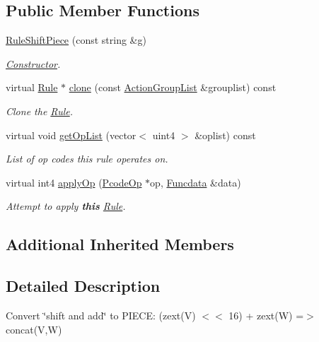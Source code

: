 \subsection*{Public Member Functions}
\begin{DoxyCompactItemize}
\item 
\mbox{\hyperlink{class_rule_shift_piece_ae172d9256665172380a01364810b1efa}{Rule\+Shift\+Piece}} (const string \&g)
\begin{DoxyCompactList}\small\item\em \mbox{\hyperlink{class_constructor}{Constructor}}. \end{DoxyCompactList}\item 
virtual \mbox{\hyperlink{class_rule}{Rule}} $\ast$ \mbox{\hyperlink{class_rule_shift_piece_a891c9165fecfdfb57858dca7701889a0}{clone}} (const \mbox{\hyperlink{class_action_group_list}{Action\+Group\+List}} \&grouplist) const
\begin{DoxyCompactList}\small\item\em Clone the \mbox{\hyperlink{class_rule}{Rule}}. \end{DoxyCompactList}\item 
virtual void \mbox{\hyperlink{class_rule_shift_piece_afbb6dc1f0c7e486d8eeaf9ee867a2871}{get\+Op\+List}} (vector$<$ uint4 $>$ \&oplist) const
\begin{DoxyCompactList}\small\item\em List of op codes this rule operates on. \end{DoxyCompactList}\item 
virtual int4 \mbox{\hyperlink{class_rule_shift_piece_a6ba7f2b28202933238d037dd1706992c}{apply\+Op}} (\mbox{\hyperlink{class_pcode_op}{Pcode\+Op}} $\ast$op, \mbox{\hyperlink{class_funcdata}{Funcdata}} \&data)
\begin{DoxyCompactList}\small\item\em Attempt to apply {\bfseries{this}} \mbox{\hyperlink{class_rule}{Rule}}. \end{DoxyCompactList}\end{DoxyCompactItemize}
\subsection*{Additional Inherited Members}


\subsection{Detailed Description}
Convert \char`\"{}shift and add\char`\"{} to P\+I\+E\+CE\+: (zext(\+V) $<$$<$ 16) + zext(\+W) =$>$ concat(\+V,\+W) 

